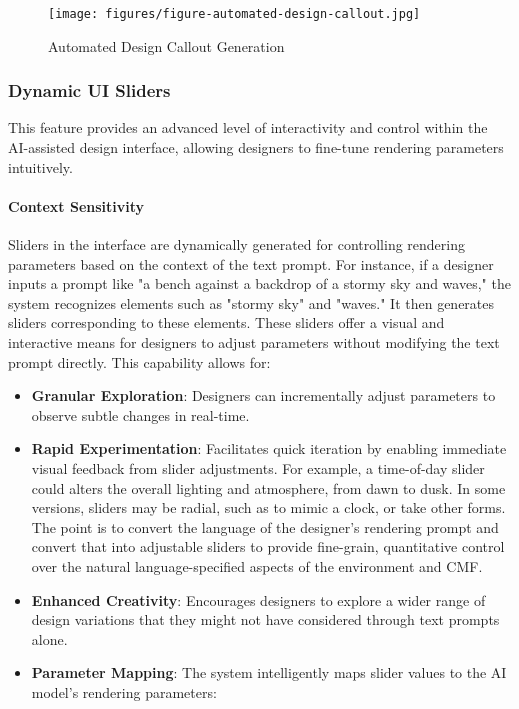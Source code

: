 \documentclass[12pt]{article}
\begin{document}
\begin{figure}[h]
    \centering
    \texttt{[image: figures/figure-automated-design-callout.jpg]}
    \caption{Automated Design Callout Generation}
    \label{fig:automated-design-callout}
\end{figure}

\subsubsection{Dynamic UI Sliders}

This feature provides an advanced level of interactivity and control within the AI-assisted design interface, allowing designers to fine-tune rendering parameters intuitively.

\paragraph{Context Sensitivity} Sliders in the interface are dynamically generated for controlling rendering parameters based on the context of the text prompt. For instance, if a designer inputs a prompt like "a bench against a backdrop of a stormy sky and waves," the system recognizes elements such as "stormy sky" and "waves." It then generates sliders corresponding to these elements. These sliders offer a visual and interactive means for designers to adjust parameters without modifying the text prompt directly. This capability allows for:

    \begin{itemize}
        \item \textbf{Granular Exploration}: Designers can incrementally adjust parameters to observe subtle changes in real-time.
        \item \textbf{Rapid Experimentation}: Facilitates quick iteration by enabling immediate visual feedback from slider adjustments. For example, a time-of-day slider could alters the overall lighting and atmosphere, from dawn to dusk. In some versions, sliders may be radial, such as to mimic a clock, or take other forms. The point is to convert the language of the designer's rendering prompt and convert that into adjustable sliders to provide fine-grain, quantitative control over the natural language-specified aspects of the environment and CMF.
        \item \textbf{Enhanced Creativity}: Encourages designers to explore a wider range of design variations that they might not have considered through text prompts alone.
        \item \textbf{Parameter Mapping}: The system intelligently maps slider values to the AI model's rendering parameters:

    \end{itemize}
\end{document}
